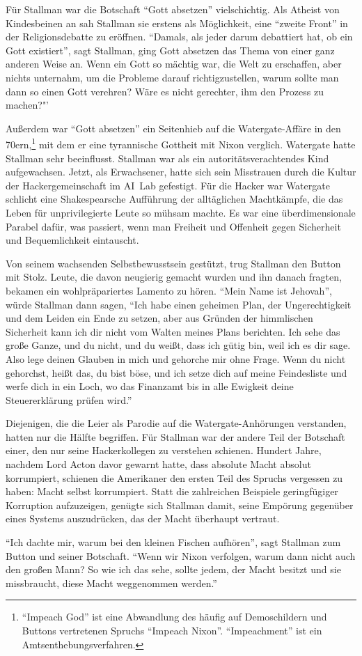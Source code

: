 Für Stallman war die Botschaft "`Gott absetzen"' vielschichtig. Als Atheist von Kindesbeinen an sah Stallman sie erstens als Möglichkeit, eine "`zweite Front"' in der Religionsdebatte zu eröffnen. "`Damals, als jeder darum debattiert hat, ob ein Gott existiert"', sagt Stallman, ging \glq Gott absetzen\grq{} das Thema von einer ganz anderen Weise an. Wenn ein Gott so mächtig war, die Welt zu erschaffen, aber nichts unternahm, um die Probleme darauf richtigzustellen, warum sollte man dann so einen Gott verehren? Wäre es nicht gerechter, ihm den Prozess zu machen?"'

Außerdem war "`Gott absetzen"' ein Seitenhieb auf die Watergate-Affäre in den 70ern,\footnote{"`Impeach God"' ist eine Abwandlung des häufig auf Demoschildern und Buttons vertretenen Spruchs "`Impeach Nixon"'. "`Impeachment"' ist ein Amtsenthebungsverfahren.} mit dem er eine tyrannische Gottheit mit Nixon verglich. Watergate hatte Stallman sehr beeinflusst. Stallman war als ein autoritätsverachtendes Kind aufgewachsen. Jetzt, als Erwachsener, hatte sich sein Misstrauen durch die Kultur der Hackergemeinschaft im AI~Lab gefestigt. Für die Hacker war Watergate schlicht eine Shakespearsche Aufführung der alltäglichen Machtkämpfe, die das Leben für unprivilegierte Leute so mühsam machte. Es war eine überdimensionale Parabel dafür, was passiert, wenn man Freiheit und Offenheit gegen Sicherheit und Bequemlichkeit eintauscht. %

Von seinem wachsenden Selbstbewusstsein gestützt, trug Stallman den Button mit Stolz. Leute, die davon neugierig gemacht wurden und ihn danach fragten, bekamen ein wohlpräpariertes Lamento zu hören. "`Mein Name ist Jehovah"', würde Stallman dann sagen, "`Ich habe einen geheimen Plan, der Ungerechtigkeit und dem Leiden ein Ende zu setzen, aber aus Gründen der himmlischen Sicherheit kann ich dir nicht vom Walten meines Plans berichten. Ich sehe das große Ganze, und du nicht, und du weißt, dass ich gütig bin, weil ich es dir sage. Also lege deinen Glauben in mich und gehorche mir ohne Frage. Wenn du nicht gehorchst, heißt das, du bist böse, und ich setze dich auf meine Feindesliste und werfe dich in ein Loch, wo das Finanzamt bis in alle Ewigkeit deine Steuererklärung prüfen wird."'

Diejenigen, die die Leier als Parodie auf die Watergate-Anhörungen verstanden, hatten nur die Hälfte begriffen. Für Stallman war der andere Teil der Botschaft einer, den nur seine Hackerkollegen zu verstehen schienen. Hundert Jahre, nachdem Lord Acton davor gewarnt hatte, dass absolute Macht absolut korrumpiert, schienen die Amerikaner den ersten Teil des Spruchs vergessen zu haben: Macht selbst korrumpiert. Statt die zahlreichen Beispiele geringfügiger Korruption aufzuzeigen, genügte sich Stallman damit, seine Empörung gegenüber eines Systems auszudrücken, das der Macht überhaupt vertraut.

"`Ich dachte mir, warum bei den kleinen Fischen aufhören"', sagt Stallman zum Button und seiner Botschaft. "`Wenn wir Nixon verfolgen, warum dann nicht auch den großen Mann? So wie ich das sehe, sollte jedem, der Macht besitzt und sie missbraucht, diese Macht weggenommen werden."'
